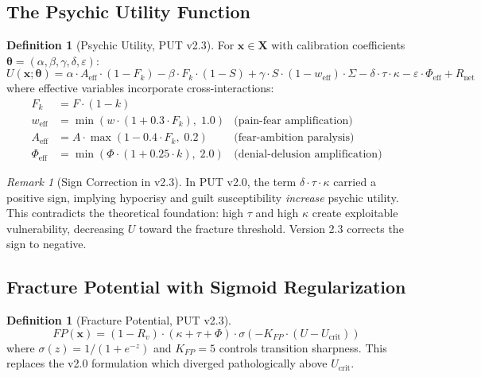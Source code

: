 \documentclass[12pt,a4paper]{article}
\theoremstyle{plain}
\theoremstyle{definition}
\newtheorem{definition}[theorem]{Definition}
\theoremstyle{remark}
\newtheorem{remark}[theorem]{Remark}
\begin{document}
\subsection{The Psychic Utility Function}

\begin{definition}[Psychic Utility, PUT v2.3]
For $\mathbf{x} \in \mathbf{X}$ with calibration coefficients $\boldsymbol{\theta} = (\alpha, \beta, \gamma, \delta, \varepsilon)$:
\[
U(\mathbf{x}; \boldsymbol{\theta}) = \alpha \cdot A_{\text{eff}} \cdot (1 - F_k) - \beta \cdot F_k \cdot (1 - S) + \gamma \cdot S \cdot (1 - w_{\text{eff}}) \cdot \Sigma - \delta \cdot \tau \cdot \kappa - \varepsilon \cdot \Phi_{\text{eff}} + R_{\text{net}}
\]
where effective variables incorporate cross-interactions:
\begin{align}
F_k &= F \cdot (1 - k) \\
w_{\text{eff}} &= \min(w \cdot (1 + 0.3 \cdot F_k),\; 1.0) & \text{(pain-fear amplification)} \\
A_{\text{eff}} &= A \cdot \max(1 - 0.4 \cdot F_k,\; 0.2) & \text{(fear-ambition paralysis)} \\
\Phi_{\text{eff}} &= \min(\Phi \cdot (1 + 0.25 \cdot k),\; 2.0) & \text{(denial-delusion amplification)}
\end{align}
\end{definition}

\begin{remark}[Sign Correction in v2.3]
In PUT v2.0, the term $\delta \cdot \tau \cdot \kappa$ carried a positive sign, implying hypocrisy and guilt susceptibility \emph{increase} psychic utility. This contradicts the theoretical foundation: high $\tau$ and high $\kappa$ create exploitable vulnerability, decreasing $U$ toward the fracture threshold. Version 2.3 corrects the sign to negative.
\end{remark}

\subsection{Fracture Potential with Sigmoid Regularization}

\begin{definition}[Fracture Potential, PUT v2.3]
\[
FP(\mathbf{x}) = (1 - R_v) \cdot (\kappa + \tau + \Phi) \cdot \sigma\!\left(-K_{FP} \cdot (U - U_{\text{crit}})\right)
\]
where $\sigma(z) = 1/(1 + e^{-z})$ and $K_{FP} = 5$ controls transition sharpness. This replaces the v2.0 formulation which diverged pathologically above $U_{\text{crit}}$.
\end{definition}
\end{document}
